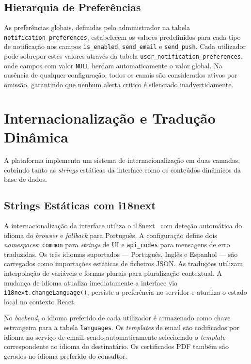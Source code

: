 \documentclass[12pt,a4paper]{report}
\begin{document}
\subsection{Hierarquia de Preferências}

As preferências globais, definidas pelo administrador na tabela \texttt{notification\_}\allowbreak\texttt{preferences}, estabelecem os valores predefinidos para cada tipo de notificação nos campos \texttt{is\_enabled}, \texttt{send\_email} e \texttt{send\_push}. Cada utilizador pode sobrepor estes valores através da tabela \texttt{user\_\allowbreak notification\_\allowbreak preferences}, onde campos com valor \texttt{NULL} herdam automaticamente o valor global. Na ausência de qualquer configuração, todos os canais são considerados ativos por omissão, garantindo que nenhum alerta crítico é silenciado inadvertidamente.

\section{Internacionalização e Tradução Dinâmica}

A plataforma implementa um sistema de internacionalização em duas camadas, cobrindo tanto as \textit{strings} estáticas da interface como os conteúdos dinâmicos da base de dados.

\subsection{Strings Estáticas com i18next}

A internacionalização da interface utiliza o i18next~\cite{i18next} com deteção automática do idioma do \textit{browser} e \textit{fallback} para Português. A configuração define dois \textit{namespaces}: \texttt{common} para \textit{strings} de UI e \texttt{api\_codes} para mensagens de erro traduzidas. Os três idiomas suportados --- Português, Inglês e Espanhol --- são carregados como importações estáticas de ficheiros JSON. As traduções utilizam interpolação de variáveis e formas plurais para pluralização contextual. A mudança de idioma atualiza imediatamente a interface via \texttt{i18next.changeLanguage()}, persiste a preferência no servidor e atualiza o estado local no contexto React.

No \textit{backend}, o idioma preferido de cada utilizador é armazenado como chave estrangeira para a tabela \texttt{languages}. Os \textit{templates} de email são codificados por idioma no serviço de email, sendo automaticamente selecionado o \textit{template} correspondente ao idioma do destinatário. Os certificados PDF também são gerados no idioma preferido do consultor.
\end{document}
